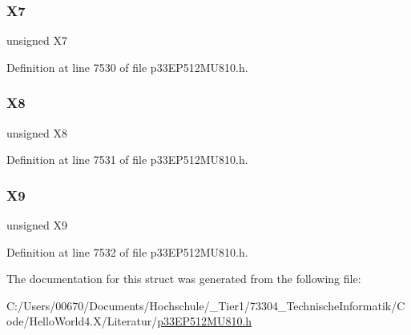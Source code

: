 \subsubsection{\texorpdfstring{X7}{X7}}
{\footnotesize\ttfamily unsigned X7}



Definition at line 7530 of file p33\+E\+P512\+M\+U810.\+h.

\mbox{\label{structtag_c_r_c_x_o_r_l_b_i_t_s_a1ee0e7fff1523e34a25864fa8f8cb814}} 
\subsubsection{\texorpdfstring{X8}{X8}}
{\footnotesize\ttfamily unsigned X8}



Definition at line 7531 of file p33\+E\+P512\+M\+U810.\+h.

\mbox{\label{structtag_c_r_c_x_o_r_l_b_i_t_s_ad1f37b081fa694c3d410236a636af0db}} 
\subsubsection{\texorpdfstring{X9}{X9}}
{\footnotesize\ttfamily unsigned X9}



Definition at line 7532 of file p33\+E\+P512\+M\+U810.\+h.



The documentation for this struct was generated from the following file\+:\begin{DoxyCompactItemize}
\item 
C\+:/\+Users/00670/\+Documents/\+Hochschule/\+\_\+\+Tier1/73304\+\_\+\+Technische\+Informatik/\+Code/\+Hello\+World4.\+X/\+Literatur/\hyperlink{p33_e_p512_m_u810_8h}{p33\+E\+P512\+M\+U810.\+h}\end{DoxyCompactItemize}
